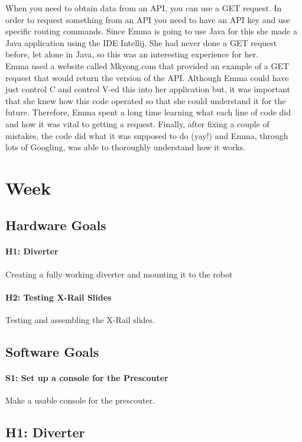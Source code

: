 \documentclass{article}
\begin{document}
When you need to obtain data from an API, you can use a GET request. In order to request something from an API you need to have an API key and use specific routing commands. Since Emma is going to use Java for this she made a Java application using the IDE Intellij. She had never done a GET request before, let alone in Java, so this was an interesting experience for her. \\

Emma used a website called Mkyong.com that provided an example of a GET request that would return the version of the API. Although Emma could have just control C and control V-ed this into her application but, it was important that she knew how this code operated so that she could understand it for the future. Therefore, Emma spent a long time learning what each line of code did and how it was vital to getting a request. Finally, after fixing a couple of mistakes, the code did what it was supposed to do (yay!) and Emma, through lots of Googling, was able to thoroughly understand how it works. \\



\clearpage \newpage \section{Week \thesection} 
\subsection{Hardware Goals}
\paragraph{H1: Diverter}
Creating a fully working diverter and mounting it to the robot
\paragraph{H2: Testing X-Rail Slides}
 Testing and assembling the X-Rail slides.
\subsection{Software Goals}
\paragraph{S1: Set up a console for the Prescouter}
 Make a usable console for the prescouter.
\newpage
\subsection{H1: Diverter}
\end{document}
